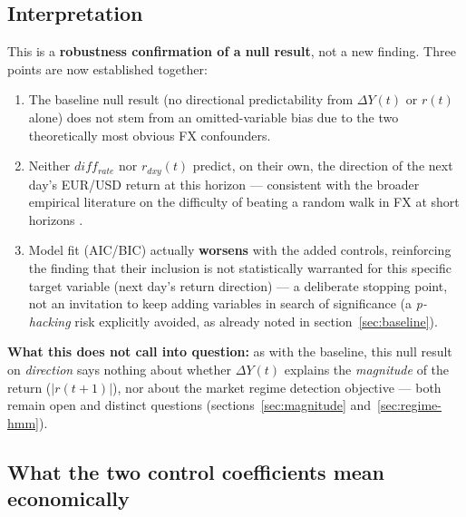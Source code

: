 \documentclass[12pt,a4paper]{article}
\begin{document}
\subsection{Interpretation}

This is a \textbf{robustness confirmation of a null result}, not
a new finding. Three points are now established
together:

\begin{enumerate}
	\item The baseline null result (no directional predictability
	from $\Delta Y(t)$ or $r(t)$ alone) does not stem from an
	omitted-variable bias due to the two theoretically most
	obvious FX confounders.
	\item Neither $diff_{rate}$ nor $r_{dxy}(t)$ predict, on their
	own, the direction of the next day's EUR/USD return at this
	horizon --- consistent with the broader empirical literature on
	the difficulty of beating a random walk in FX at short horizons
	\citep{meeserogoff1983}.
	\item Model fit (AIC/BIC) actually \textbf{worsens}
	with the added controls, reinforcing the finding that their
	inclusion is not statistically warranted for this specific
	target variable (next day's return direction) --- a deliberate
	stopping point, not an invitation to keep adding
	variables in search of significance (a
	\emph{p-hacking} risk explicitly avoided, as already noted in
	section~\ref{sec:baseline}).
\end{enumerate}

\newpage
\textbf{What this does not call into question:} as with the baseline,
this null result on \emph{direction} says nothing about whether
$\Delta Y(t)$ explains the \emph{magnitude} of the return
($|r(t+1)|$), nor about the market regime detection
objective --- both remain open and distinct questions
(sections~\ref{sec:magnitude} and~\ref{sec:regime-hmm}).

\subsection{What the two control coefficients mean economically}
\end{document}
